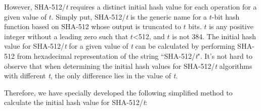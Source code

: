 \documentclass[main\_\_EN.tex]{subfiles}
\begin{document}
However, SHA-512/{\it{t}} requires a distinct initial hash value for each operation for a given value of \begin{math}t\end{math}. Simply put, SHA-512/{\it{t}} is the generic name for a \begin{math}t\end{math}-bit hash function based on SHA-512 whose output is truncated to \begin{math}t\end{math} bits. \begin{math}t\end{math} is any positive integer without a leading zero such that \begin{math}t\end{math}<512, and \begin{math}t\end{math} is not 384. The initial hash value for SHA-512/{\it{t}} for a given value of {\it{t}} can be calculated by performing SHA-512 from hexadecimal representation of the string ``SHA-512/{\it{t}}". It's not hard to observe that when determining the initial hash values for SHA-512/{\it{t}} algorithms with different {\it{t}}, the only difference lies in the value of {\it{t}}.

Therefore, we have specially developed the following simplified method to calculate the initial hash value for SHA-512/{\it{t}}:
\end{document}
